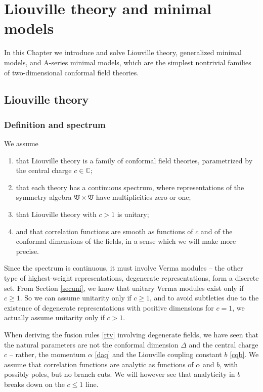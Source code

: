 \documentclass[12pt, a4paper, notitlepage, twoside]{report}
\numberwithin{equation}{section}
\theoremstyle{break}
\begin{document}

\cleardoublepage

\chapter{Liouville theory and minimal models \label{seccbm}}

In this Chapter we introduce and solve Liouville theory, generalized minimal models, and A-series minimal models, which are the simplest nontrivial families of two-dimensional conformal field theories. 

\section{Liouville theory \label{secliou}}

\subsection{Definition and spectrum \label{secspe}}

We assume 
\begin{enumerate}
 \item that Liouville theory is a family of conformal field theories, parametrized by the central charge $c\in\mathbb{C}$;
\item that each theory has a continuous spectrum, where representations of the symmetry algebra $\mathfrak{V}\times\overline{\mathfrak{V}}$ have multiplicities zero or one;
\item that Liouville theory with $c>1$ is unitary;
\item and that correlation functions are smooth as functions of $c$ and of the conformal dimensions of the fields, in a sense which we will make more precise.
\end{enumerate}
Since the spectrum is continuous, it must involve Verma modules -- the other type of highest-weight representations, degenerate representations, form a discrete set. 
From Section \ref{secuni}, we know that unitary Verma modules exist only if $c\geq 1$. 
So we can assume unitarity only if $c\geq 1$, and to avoid subtleties due to the existence of degenerate representations with positive dimensions for $c=1$, we actually assume unitarity only if $c>1$. 

When deriving the fusion rules \eqref{rtv} involving degenerate fields, we have seen that the natural parameters are not the conformal dimension $\Delta$ and the central charge $c$ -- rather, the momentum $\alpha$ \eqref{daq} and the Liouville coupling constant $b$ \eqref{cqb}.
We assume that correlation functions are analytic as functions of $\alpha$ and $b$, with possibly poles, but no branch cuts. 
We will however see that analyticity in $b$ breaks down on the $c\leq 1$ line.
\end{document}
